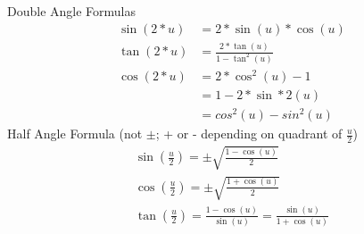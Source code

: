 \documentclass{article}
\begin{document}
	Double Angle Formulas
	\begin{align*}
		\sin(2 * u) &= 2 * \sin(u) * \cos(u) \\
		\tan(2 * u) &= \frac{ 2 * \tan(u)}{1 - \tan^2(u)} \\
		\cos(2 * u) &= 2 * \cos^2(u) - 1 \\
		&= 1 - 2 * \sin*2(u) \\
		&= cos^2(u) - sin^2(u)
	\end{align*}
	Half Angle Formula (not $\pm$; + or - depending on quadrant of $\frac{u}{2}$)
	\begin{align*}
		\sin(\frac{u}{2}) = \pm \sqrt{ \frac{1 - \cos(u)}{2} } \\
		\cos(\frac{u}{2}) = \pm \sqrt{ \frac{1 + \cos(u)}{2} } \\
		\tan(\frac{u}{2}) = \frac{1 - \cos(u)}{\sin(u)} = \frac{\sin(u)}{1 + \cos(u)}
	\end{align*}
\end{document}
